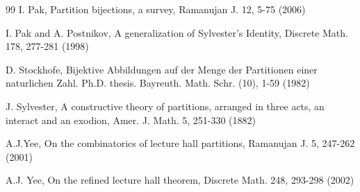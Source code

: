 \documentclass[11pt]{article}
\begin{document}
\begin{thebibliography}{99}
 I. Pak, Partition bijections, a survey, Ramanujan J. 12, 5-75 (2006)

 I. Pak and A. Postnikov, A generalization of Sylvester's Identity, Discrete Math. 178, 277-281 (1998)

 D. Stockhofe, Bijektive Abbildungen auf der Menge der Partitionen einer naturlichen Zahl. Ph.D. thesis. Bayreuth. Math. Schr. (10), 1-59 (1982)

 J. Sylvester, A constructive theory of partitions, arranged in three acts, an interact and an exodion, Amer. J. Math. 5, 251-330 (1882) 

 A.J.Yee, On the combinatorics of lecture hall partitions, Ramanujan J. 5, 247-262 (2001)

 A.J. Yee, On the refined lecture hall theorem, Discrete Math. 248,  293-298 (2002)

\end{thebibliography}
\end{document}
